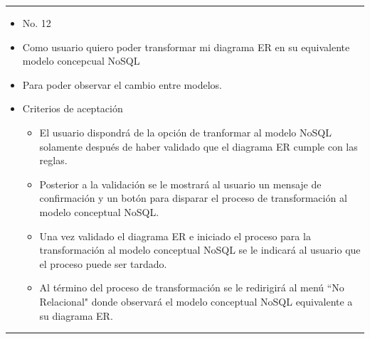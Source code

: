 \noindent\rule{\textwidth}{1pt}
\begin{itemize}
	\item No. 12
	\item Como usuario quiero poder transformar mi diagrama ER en su equivalente modelo concepcual NoSQL
	\item Para poder observar el cambio entre modelos.
	\item Criterios de aceptación
	\begin{itemize}
		\item El usuario dispondrá de la opción de tranformar al modelo NoSQL solamente después de haber validado que el diagrama ER cumple con las reglas.
		\item Posterior a la validación se le mostrará al usuario un mensaje de confirmación y un botón para disparar el proceso de transformación al modelo conceptual NoSQL.
		\item Una vez validado el diagrama ER e iniciado el proceso para la transformación al modelo conceptual NoSQL se le indicará al usuario que el proceso puede ser tardado.
		\item Al término del proceso de transformación se le redirigirá al menú ``No Relacional" donde observará el modelo conceptual NoSQL equivalente a su diagrama ER.
	\end{itemize}
\end{itemize}
\noindent\rule{\textwidth}{1pt}
